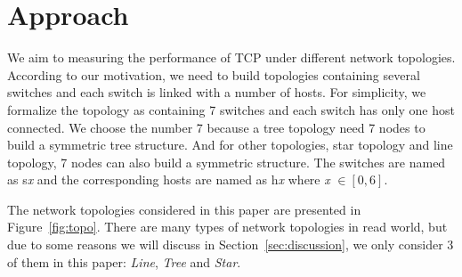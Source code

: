 \section{Approach} \label{sec:approach}

We aim to measuring the performance of TCP under different network topologies.
According to our motivation, we need to build topologies containing several
switches and each switch is linked with a number of hosts. For simplicity,
we formalize the topology as containing 7 switches and each switch has only 
one host connected. We choose the number 7 because a tree topology need 7 nodes
to build a symmetric tree structure. And for other topologies, \eg star topology
and line topology, 7 nodes can also build a symmetric structure. The switches are named
as s{\it x} and the corresponding hosts are named as h{\it x} where {\it x} $\in [0, 6]$.

The network topologies considered in this paper are presented in Figure~\ref{fig:topo}.
There are many types of network topologies in read world, but
due to some reasons we will discuss in Section~\ref{sec:discussion}, we only consider
3 of them in this paper: {\it Line}, {\it Tree} and {\it Star}. 

